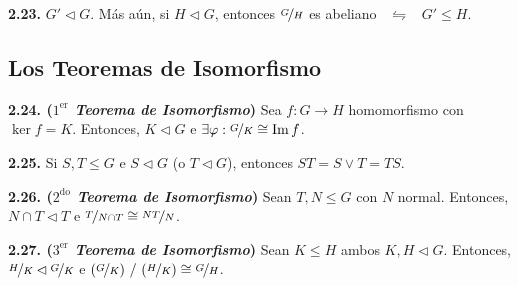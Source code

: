 \hypertarget{thm223}{}
\begin{theorem}
    \textbf{2.23.} \(G' \lhd G\). Más aún, si \(H\lhd G\), entonces \(\nicefrac{G}{H}\) es abeliano \ \(\leftrightharpoons\) \ \(G' \leq H\). 
\end{theorem}


\subsection*{Los Teoremas de Isomorfismo}

\hypertarget{thm224}{}
\begin{theorem}
    \textbf{2.24. (\emph{\(1^\text{er}\) Teorema de Isomorfismo})} Sea \(f : G \to H\) homomorfismo con \(\ker f = K \). Entonces, \(K \lhd G\) e \(\exists \varphi : \nicefrac{G}{K} \cong \operatorname{Im}f\). 
\end{theorem}

\begin{lemma}
    \textbf{2.25.} Si \(S, T \leq G\) e \(S \lhd G\) (o \(T\lhd G\)), entonces \(ST = S \lor T = TS\). 
\end{lemma}


\hypertarget{thm226}{}
\begin{theorem}
    \textbf{2.26. (\emph{\(2^\text{do}\) Teorema de Isomorfismo})} Sean \(T, N \leq G\) con \(N\) normal. Entonces, \(N \cap T\lhd T\) e \(\nicefrac{T}{N\cap T}\cong \nicefrac{NT}{N}\). 
\end{theorem}

\begin{theorem}
    \textbf{2.27. (\emph{\(3^\text{er}\) Teorema de Isomorfismo})} Sean \(K \leq H\) ambos \(K, H \lhd G\). Entonces, \(\nicefrac{H}{K}\lhd \nicefrac{G}{K}\) e \((\nicefrac{G}{K}) \ \slash \ (\nicefrac{H}{K}) \cong \nicefrac{G}{H}\). 
\end{theorem}

